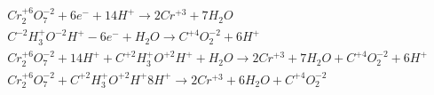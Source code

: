 \documentclass[a4paper]{article}
\begin{document}
\subsection{}
\begin{align}
  Cr_2^{+6}O_7^{-2} + 6e^- + 14H^+ \rightarrow 2 Cr^{+3}+ 7H_2O\\
  C^{-2}H_3^+O^{-2}H^+ -6e^- + H_2O   \rightarrow C^{+4}O_2^{-2} + 6H^+\\
Cr_2^{+6}O_7^{-2} +  14H^+ + C^{+2}H_3^+O^{+2}H^+ + H_2O \rightarrow
 2 Cr^{+3}+ 7H_2O + C^{+4}O_2^{-2} + 6H^+\\
Cr_2^{+6}O_7^{-2}  + C^{+2}H_3^+O^{+2}H^+ 8 H^+ \rightarrow
 2 Cr^{+3}+ 6H_2O + C^{+4}O_2^{-2} 
\end{align}
\end{document}
